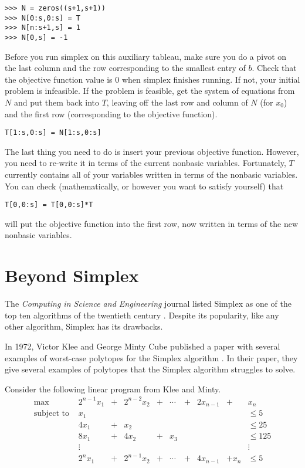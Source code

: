\begin{lstlisting}
>>> N = zeros((s+1,s+1))
>>> N[0:s,0:s] = T
>>> N[n:s+1,s] = 1
>>> N[0,s] = -1
\end{lstlisting}

Before you run simplex on this auxiliary tableau, make sure you do a pivot on the last column and the row corresponding to the smallest entry of $b$.
Check that the objective function value is 0 when simplex finishes running.
If not, your initial problem is infeasible.
If the problem is feasible, get the system of equations from $N$ and put them back into $T$, leaving off the last row and column of $N$ (for $x_0$) and the first row (corresponding to the objective function).

\begin{lstlisting}
T[1:s,0:s] = N[1:s,0:s]
\end{lstlisting}

The last thing you need to do is insert your previous objective function.
However, you need to re-write it in terms of the current nonbasic variables.
Fortunately, $T$ currently contains all of your variables written in terms of the nonbasic variables.
You can check (mathematically, or however you want to satisfy yourself) that

\begin{lstlisting}
T[0,0:s] = T[0,0:s]*T
\end{lstlisting} %

will put the objective function into the first row, now written in terms of the new nonbasic variables.


\section*{Beyond Simplex}
The \emph{Computing in Science and Engineering} journal listed Simplex as one of the top ten algorithms of the twentieth century \cite{Nash2000}.
Despite its popularity, like any other algorithm, Simplex has its drawbacks.

In 1972, Victor Klee and George Minty Cube published a paper with several examples of worst-case polytopes for the Simplex algorithm \cite{Klee1972}.
In their paper, they give several examples of polytopes that the Simplex algorithm struggles to solve.

Consider the following linear program from Klee and Minty.
\begin{align*}
\text{max } & 2^{n-1}x_1 & + & 2^{n-2}x_2  & + & \cdots & + & 2x_{n-1} & + & x_n\\
\text{subject to } & x_1 &  &  &  &  &  &  &  &\leq 5\\
& 4x_1 & + & x_2 &  &  &  &  &  &\leq 25\\
& 8x_1 & + & 4x_2 & + & x_3 &  &  &  &\leq 125\\
& \vdots & &      &   &     &  &  &  &\vdots\\
& 2^n x_1 & + & 2^{n-1} x_2 & + & \cdots & + & 4x_{n-1} & + x_n &\leq 5\\
\end{align*}

